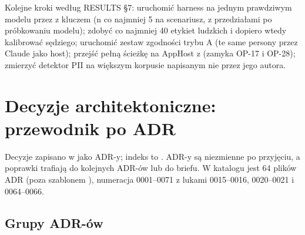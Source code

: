 Kolejne kroki według RESULTS §7: uruchomić harness na jednym prawdziwym modelu przez  z kluczem (n co najmniej 5 na scenariusz, z przedziałami po próbkowaniu modelu); zdobyć co najmniej 40 etykiet ludzkich i dopiero wtedy kalibrować sędziego; uruchomić zestaw zgodności trybu A (te same persony przez Claude jako host); przejść pełną ścieżkę na AppHost z  (zamyka OP-17 i OP-28); zmierzyć detektor PII na większym korpusie napisanym nie przez jego autora.

\section{Decyzje architektoniczne: przewodnik po ADR}
\label{sec:p4-adr}

Decyzje zapisano w  jako ADR-y; indeks to . ADR-y są niezmienne po przyjęciu, a poprawki trafiają do kolejnych ADR-ów lub do briefu. W katalogu jest 64 plików ADR (poza szablonem ), numeracja 0001--0071 z lukami 0015--0016, 0020--0021 i 0064--0066.


\subsection{Grupy ADR-ów}

